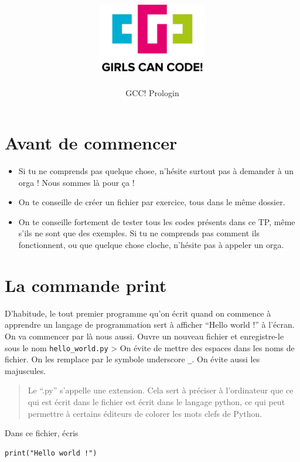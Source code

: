 \documentclass[a4paper,french,11pt]{article}
\title{
    \protect\centering\protect\includegraphics[height=3cm]{../logo_gcc_long.pdf}\\
    {}
}
\author{GCC! \textendash{} Prologin}
\date{}
\begin{document}
\maketitle

\hypertarget{avant-de-commencer}{%
\section{Avant de commencer}\label{avant-de-commencer}}

\begin{itemize}
\item
  Si tu ne comprends pas quelque chose, n'hésite surtout pas à demander
  à un orga ! Nous sommes là pour ça !
\item
  On te conseille de créer un fichier par exercice, tous dans le même
  dossier.
\item
  On te conseille fortement de tester tous les codes présents dans ce
  TP, même s'ils ne sont que des exemples. Si tu ne comprends pas
  comment ils fonctionnent, ou que quelque chose cloche, n'hésite pas à
  appeler un orga.
\end{itemize}

\hypertarget{la-commande-print}{%
\section{La commande print}\label{la-commande-print}}

D'habitude, le tout premier programme qu'on écrit quand on commence à
apprendre un langage de programmation sert à afficher ``Hello world !''
à l'écran. On va commencer par là nous aussi. Ouvre un nouveau fichier
et enregistre-le sous le nom \texttt{hello_world.py}
\textgreater{} On évite de mettre des espaces dans les noms de fichier.
On les remplace par le symbole underscore \texttt{_}. On
évite aussi les majuscules.

\begin{quote}
Le ``.py'' s'appelle une extension. Cela sert à préciser à l'ordinateur
que ce qui est écrit dans le fichier est écrit dans le langage python,
ce qui peut permettre à certains éditeurs de colorer les mots clefs de
Python.
\end{quote}

Dans ce fichier, écris

\begin{verbatim}
print("Hello world !")
\end{verbatim}
\end{document}
